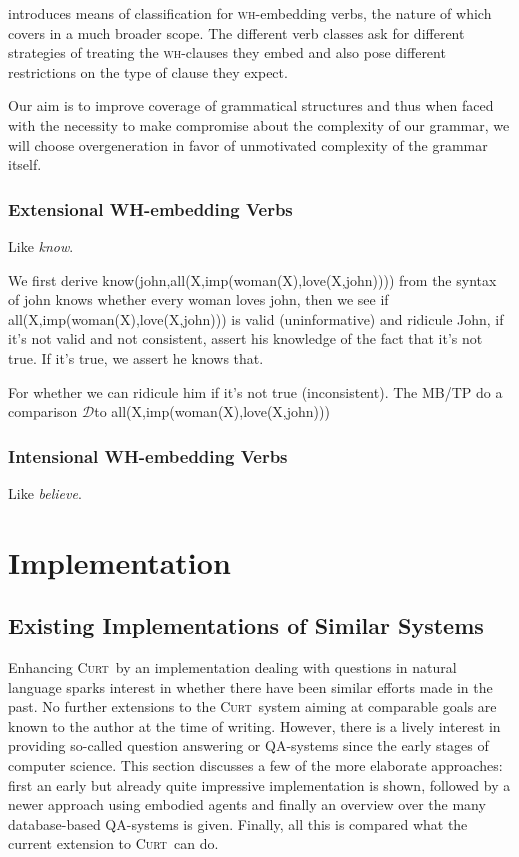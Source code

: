 \documentclass[a4paper,fontsize=12pt]{article}
\newcommand{\pn}{\textsc} %
\newcommand{\Disc}{\ensuremath{\mathcal{D}}} %
\newcommand{\wh}{\textsc{wh}} %
\newcommand{\curt}{\pn{Curt}\mbox{ }}
\theoremstyle{remark} \newtheorem*{termin}{Definition} %
\begin{document}
\cite{karttunen:1977} introduces means of classification for \wh-embedding
verbs, the nature of which \cite{lahiri:diss} covers in a much broader scope.
The different verb classes ask for different strategies of treating the
\wh-clauses they embed and also pose different restrictions on the type of
clause they expect.

Our aim is to improve coverage of grammatical structures and thus when faced
with the necessity to make compromise about the complexity of our grammar, we
will choose overgeneration in favor of unmotivated complexity of the grammar
itself.

\subsubsection{Extensional WH-embedding Verbs}

Like \emph{know}.

We first derive know(john,all(X,imp(woman(X),love(X,john)))) from the syntax of
john knows whether every woman loves john, then we see if
all(X,imp(woman(X),love(X,john))) is valid (uninformative) and ridicule John, if
it's not valid and not consistent, assert his knowledge of the fact that it's
not true. If it's true, we assert he knows that.

For whether we can ridicule him if it's not true (inconsistent).
The MB/TP do a comparison \Disc to all(X,imp(woman(X),love(X,john)))

\subsubsection{Intensional WH-embedding Verbs}

Like \emph{believe}.

\section{Implementation}

\subsection{Existing Implementations of Similar Systems}\label{sec:othercrap}

Enhancing \curt by an implementation dealing with questions in natural language
sparks interest in whether there have been similar efforts made in the past. No
further extensions to the \curt system aiming at comparable goals are known to the
author at the time of writing. However, there is a lively interest in providing
so-called question answering or QA-systems since the early stages of computer
science. %
This section discusses a few of the more elaborate approaches: first an early
but already quite impressive implementation is shown, followed by a newer approach
using embodied agents and finally an overview over the many database-based
QA-systems is given. Finally, all this is compared what the current extension to
\curt can do.
\end{document}
